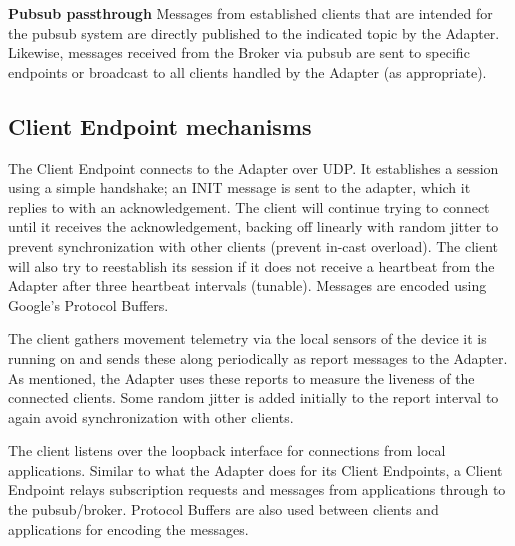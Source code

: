\textbf{Pubsub passthrough} Messages from established clients that are
intended for the pubsub system are directly published to the indicated
topic by the Adapter. Likewise, messages received from the Broker via
pubsub are sent to specific endpoints or broadcast to all clients
handled by the Adapter (as appropriate).
    
\subsection{Client Endpoint mechanisms}

The \name{} Client Endpoint connects to the Adapter over UDP. It
establishes a session using a simple handshake; an INIT message is
sent to the adapter, which it replies to with an acknowledgement. The
client will continue trying to connect until it receives the
acknowledgement, backing off linearly with random jitter to prevent
synchronization with other clients (prevent in-cast overload). The
client will also try to reestablish its session if it does not receive
a heartbeat from the Adapter after three heartbeat intervals (tunable).
Messages are encoded using Google's Protocol Buffers.

The client gathers movement telemetry via the local sensors of the
device it is running on and sends these along periodically as report
messages to the Adapter.  As mentioned, the Adapter uses these reports
to measure the liveness of the connected clients.  Some random jitter
is added initially to the report interval to again avoid
synchronization with other clients.

The client listens over the loopback interface for connections from
local applications.  Similar to what the Adapter does for its Client
Endpoints, a Client Endpoint relays subscription requests and messages
from applications through to the pubsub/broker.  Protocol Buffers are
also used between clients and applications for encoding the messages.

% 
%

